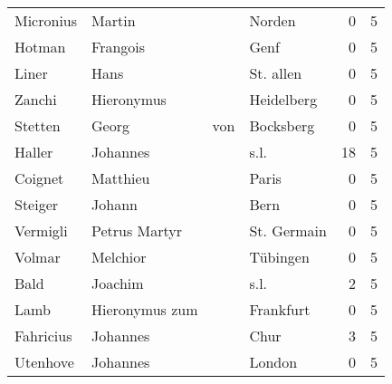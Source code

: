 \begin{center}
\begin{tiny}
\begin{longtabu}{llllrr}
                Micronius &                             Martin &             &                                      Norden &          0 &         5 \\
                   Hotman &                           Frangois &             &                                        Genf &          0 &         5 \\
                    Liner &                               Hans &             &                                   St. allen &          0 &         5 \\
                   Zanchi &                         Hieronymus &             &                                  Heidelberg &          0 &         5 \\
                  Stetten &                              Georg &         von &                                   Bocksberg &          0 &         5 \\
                   Haller &                           Johannes &             &                                        s.l. &         18 &         5 \\
                  Coignet &                           Matthieu &             &                                       Paris &          0 &         5 \\
                  Steiger &                             Johann &             &                                        Bern &          0 &         5 \\
                 Vermigli &                      Petrus Martyr &             &                                 St. Germain &          0 &         5 \\
                   Volmar &                           Melchior &             &                                    Tübingen &          0 &         5 \\
                     Bald &                            Joachim &             &                                        s.l. &          2 &         5 \\
                     Lamb &                     Hieronymus zum &             &                                   Frankfurt &          0 &         5 \\
                Fahricius &                           Johannes &             &                                        Chur &          3 &         5 \\
                 Utenhove &                           Johannes &             &                                      London &          0 &         5 \\

\end{longtabu}
\end{tiny}
\end{center}
